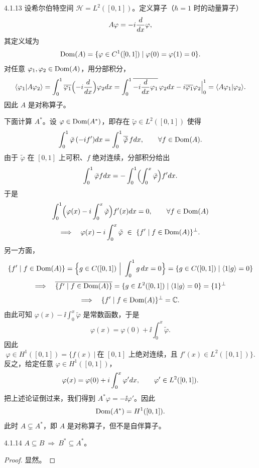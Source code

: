 \begin{example}{4.1.13}
  设希尔伯特空间 $\mathcal{H}=L^2([0,1])$。定义算子（$\hbar=1$ 时的动量算子）
  \[
  A\varphi=-i\frac{d}{d x}\varphi,
  \]
  其定义域为
  \[
  \operatorname{Dom}(A)=\{\varphi\in C^1([0,1])\mid\varphi(0)=\varphi(1)=0\}.
  \]
  对任意 $\varphi_1,\varphi_2\in\operatorname{Dom}(A)$，用分部积分，
  \[
  \langle \varphi_1|A\varphi_2\rangle
  =\int_0^1\overline{\varphi_1}\Bigl(-i\frac{d}{d x}\Bigr)\varphi_2d x
  =\int_0^1\overline{-i\frac{d}{d x}\varphi_1}\,\varphi_2d x
  -i\overline{\varphi_1}\varphi_2\Big|_0^1
  =\langle A\varphi_1|\varphi_2\rangle.
  \]
  因此 $A$ 是对称算子。

  下面计算 $A^*$。设 $\varphi\in\operatorname{Dom}(A^*)$，即存在 $\tilde\varphi\in L^2([0,1])$ 使得
  \[
  \int_0^1\bar\varphi\,(-i f')d x=\int_0^1\overline{\tilde\varphi}\,fd x,
  \qquad\forall f\in\operatorname{Dom}(A).
  \]
  由于 $\tilde\varphi$ 在 $[0,1]$ 上可积、$f$ 绝对连续，分部积分给出
  \[
  \int_0^1\bar\varphi fd x=-\int_0^1\Bigl(\int_0^x\bar\varphi\Bigr)f'd x.
  \]
  于是
  \[
  \int_0^1\Bigl(\varphi(x)-i\int_0^x\tilde\varphi\Bigr)f'(x)d x=0,
  \qquad\forall f\in\operatorname{Dom}(A)
  \]
  \[
  \Longrightarrow\quad
  \varphi(x)-i\int_0^x\tilde\varphi\ \in\ \{f'\mid f\in\operatorname{Dom}(A)\}^{\perp}.
  \]
  另一方面，
  \[
  \{f'\mid f\in\Dom(A)\}=\Bigl\{g\in C([0,1])\ \Big|\ \int_0^1 g\,\rd x=0\Bigr\}
  =\{g\in C([0,1])\mid\braket{1}{g}=0\}
  \]
  \[
  \Longrightarrow\quad
  \overline{\{f'\mid f\in\operatorname{Dom}(A)\}}=\{g\in L^2([0,1])\mid\langle 1|g\rangle=0\}=\{1\}^{\perp}
  \]
  \[
  \Longrightarrow\quad
  \{f'\mid f\in\operatorname{Dom}(A)\}^{\perp}=\mathbb{C}.
  \]
  由此可知 $\varphi(x)-\ii\int_0^x\tilde\varphi$ 是常数函数，于是
  \[
  \varphi(x)=\varphi(0)+\ii\int_0^x\tilde\varphi.
  \]
  因此
  \[
  \varphi\in H^1([0,1])=\bigl\{f(x)\ \big|\ \text{在 }[0,1]\text{ 上绝对连续，且 } f'(x)\in L^2([0,1])\bigr\}.
  \]
  反之，给定任意 $\varphi\in H^1([0,1])$，
  \[
  \varphi(x)=\varphi(0)+i\int_0^x\varphi'd x,\qquad\varphi'\in L^2([0,1]).
  \]
  把上述论证倒过来，我们得到 $A^*\varphi=-\ii\varphi'$。因此
  \[
  \operatorname{Dom}(A^*)=H^1([0,1]).
  \]
  此时 $A\subsetneq A^*$，即 $A$ 是对称算子，但不是自伴算子。
\end{example}

\begin{proposition}{4.1.14}
  $A\subseteq B\ \Longrightarrow\ B^*\subseteq A^*$。
\end{proposition}

\begin{proof}
  显然。
\end{proof}

